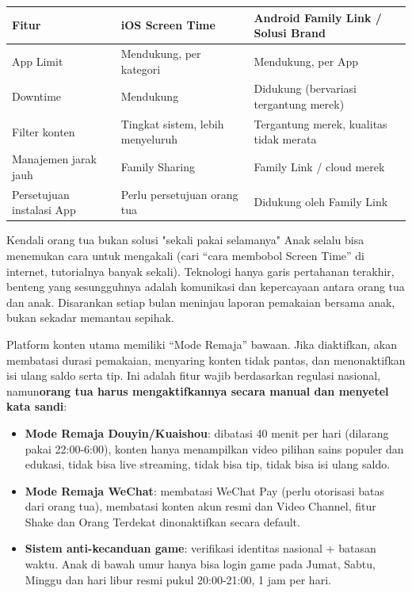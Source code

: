 \begin{center}
\begin{tabularx}{\linewidth}{|X|X|X|}
\hline
\textbf{Fitur} & \textbf{iOS Screen Time} & \textbf{Android Family Link / Solusi Brand} \tabularnewline
\hline
App Limit & Mendukung, per kategori & Mendukung, per App \tabularnewline
Downtime & Mendukung & Didukung (bervariasi tergantung merek) \tabularnewline
Filter konten & Tingkat sistem, lebih menyeluruh & Tergantung merek, kualitas tidak merata \tabularnewline
Manajemen jarak jauh & Family Sharing & Family Link / cloud merek \tabularnewline
Persetujuan instalasi App & Perlu persetujuan orang tua & Didukung oleh Family Link \tabularnewline
\hline
\end{tabularx}
\end{center}

\begin{tcbwarn}{Kendali orang tua bukan solusi "sekali pakai selamanya"}
Anak selalu bisa menemukan cara untuk mengakali (cari “cara membobol Screen Time” di internet, tutorialnya banyak sekali). Teknologi hanya garis pertahanan terakhir, benteng yang sesungguhnya adalah komunikasi dan kepercayaan antara orang tua dan anak. Disarankan setiap bulan meninjau laporan pemakaian bersama anak, bukan sekadar memantau sepihak.

\end{tcbwarn}


Platform konten utama memiliki “Mode Remaja” bawaan. Jika diaktifkan, akan membatasi durasi pemakaian, menyaring konten tidak pantas, dan menonaktifkan isi ulang saldo serta tip. Ini adalah fitur wajib berdasarkan regulasi nasional, namun\textbf{orang tua harus mengaktifkannya secara manual dan menyetel kata sandi}:

\begin{itemize}
  \item \textbf{Mode Remaja Douyin/Kuaishou}: dibatasi 40 menit per hari (dilarang pakai 22:00-6:00), konten hanya menampilkan video pilihan sains populer dan edukasi, tidak bisa live streaming, tidak bisa tip, tidak bisa isi ulang saldo.
  \item \textbf{Mode Remaja WeChat}: membatasi WeChat Pay (perlu otorisasi batas dari orang tua), membatasi konten akun resmi dan Video Channel, fitur Shake dan Orang Terdekat dinonaktifkan secara default.
  \item \textbf{Sistem anti-kecanduan game}: verifikasi identitas nasional + batasan waktu. Anak di bawah umur hanya bisa login game pada Jumat, Sabtu, Minggu dan hari libur resmi pukul 20:00-21:00, 1 jam per hari.
\end{itemize}

